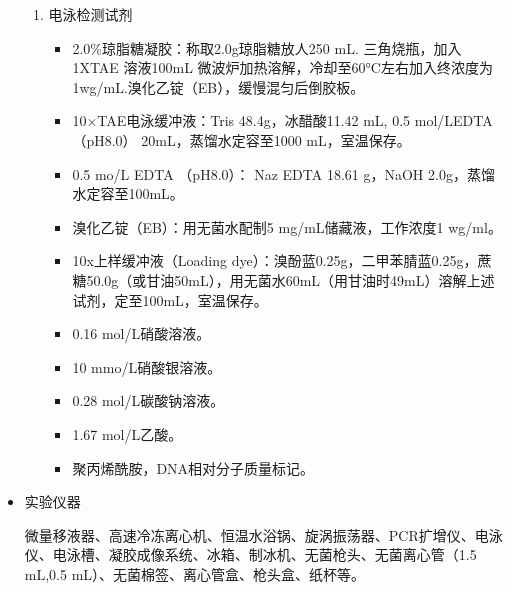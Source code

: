 \documentclass[AutoFakeBold]{LZUThesis}
\begin{document}
\begin{itemize}
\begin{enumerate}
        \item 电泳检测试剂
        \begin{itemize}
            \item 2.0\%琼脂糖凝胶：称取2.0g琼脂糖放人250 mL. 三角烧瓶，加入1XTAE 溶液100mL 微波炉加热溶解，冷却至60°C左右加入终浓度为1wg/mL.溴化乙锭（EB），缓慢混匀后倒胶板。\par
            \item 10×TAE电泳缓冲液：Tris 48.4g，冰醋酸11.42 mL, 0.5 mol/LEDTA （pH8.0） 20mL，蒸馏水定容至1000 mL，室温保存。\par
            \item 0.5 mo/L EDTA （pH8.0）： Naz EDTA 18.61 g，NaOH 2.0g，蒸馏水定容至100mL。\par
            \item 溴化乙锭（EB）：用无菌水配制5 mg/mL储藏液，工作浓度1 wg/ml。\par
            \item  10x上样缓冲液（Loading dye）：溴酚蓝0.25g，二甲苯腈蓝0.25g，蔗糖50.0g（或甘油50mL），用无菌水60mL（用甘油时49mL）溶解上述试剂，定至100mL，室温保存。\par
            \item 0.16 mol/L硝酸溶液。\par
            \item  10 mmo/L硝酸银溶液。\par
            \item 0.28 mol/L碳酸钠溶液。\par
            \item 1.67 mol/L乙酸。\par
            \item 聚丙烯酰胺，DNA相对分子质量标记。\par
        \end{itemize}
    \end{enumerate}
    \item 实验仪器\par
    微量移液器、高速冷冻离心机、恒温水浴锅、旋涡振荡器、PCR扩增仪、电泳仪、电泳槽、凝胶成像系统、冰箱、制冰机、无菌枪头、无菌离心管（1.5 mL,0.5 mL）、无菌棉签、离心管盒、枪头盒、纸杯等。
\end{itemize}
\end{document}
